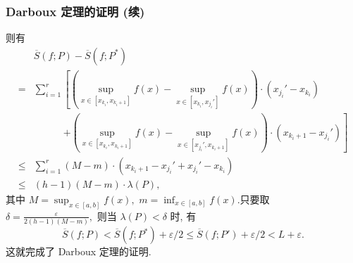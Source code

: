 \begin{frame}
\frametitle{Darboux 定理的证明 (续)}

则有
\begin{align*}
& \overline{S}(f; P) - \overline{S}(f; P^*) \\
= & \sum_{i=1}^r \left[ \left( \sup_{x \in [x_{k_i}, x_{k_i + 1}]} f(x) - \sup_{x \in [x_{k_i}, x_{j_i}']} f(x) \right) \cdot (x_{j_i}' - x_{k_i}) \right. \\
& \hspace{3em} \left. + \left( \sup_{x \in [x_{k_i}, x_{k_i + 1}]} f(x) - \sup_{x \in [x_{j_i}', x_{k_i + 1}]} f(x) \right) \cdot (x_{k_i + 1} - x_{j_i}') \right] \\
\leqslant & \sum_{i=1}^r (M - m) \cdot (x_{k_i + 1} - x_{j_i}' + x_{j_i}' - x_{k_i}) \\
\leqslant & (h - 1)(M - m) \cdot \lambda(P),
\end{align*}
其中 $M = \sup_{x \in [a,b]} f(x),$ $m = \inf_{x \in [a,b]} f(x).$只要取 $\delta = \frac{\varepsilon}{2(h-1)(M - m)},$ 则当 $\lambda(P) < \delta$ 时, 有
\[\overline{S}(f; P) < \overline{S}(f; P^*) + \varepsilon/2 \leqslant \overline{S}(f; P') + \varepsilon/2 < L + \varepsilon.\]
这就完成了 Darboux 定理的证明.

\end{frame}


